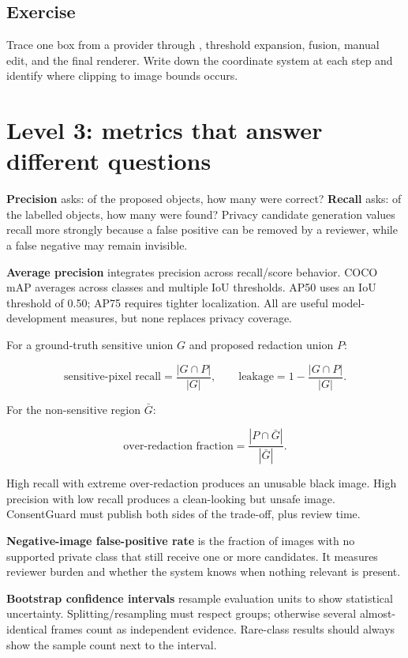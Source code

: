 \subsection*{Exercise}
Trace one box from a provider through , threshold expansion, fusion, manual edit, and the final renderer. Write down the coordinate system at each step and identify where clipping to image bounds occurs.

\section{Level 3: metrics that answer different questions}

\textbf{Precision} asks: of the proposed objects, how many were correct? \textbf{Recall} asks: of the labelled objects, how many were found? Privacy candidate generation values recall more strongly because a false positive can be removed by a reviewer, while a false negative may remain invisible.

\textbf{Average precision} integrates precision across recall/score behavior. COCO mAP averages across classes and multiple IoU thresholds. AP50 uses an IoU threshold of 0.50; AP75 requires tighter localization. All are useful model-development measures, but none replaces privacy coverage.

For a ground-truth sensitive union $G$ and proposed redaction union $P$:

\[
  \text{sensitive-pixel recall} = \frac{|G \cap P|}{|G|},
  \qquad
  \text{leakage} = 1 - \frac{|G \cap P|}{|G|}.
\]

For the non-sensitive region $\bar{G}$:

\[
  \text{over-redaction fraction} = \frac{|P \cap \bar{G}|}{|\bar{G}|}.
\]

\begin{truthbox}
High recall with extreme over-redaction produces an unusable black image. High precision with low recall produces a clean-looking but unsafe image. ConsentGuard must publish both sides of the trade-off, plus review time.
\end{truthbox}

\textbf{Negative-image false-positive rate} is the fraction of images with no supported private class that still receive one or more candidates. It measures reviewer burden and whether the system knows when nothing relevant is present.

\textbf{Bootstrap confidence intervals} resample evaluation units to show statistical uncertainty. Splitting/resampling must respect groups; otherwise several almost-identical frames count as independent evidence. Rare-class results should always show the sample count next to the interval.

